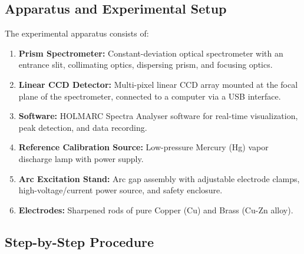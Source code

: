 \documentclass[12pt, a4paper]{article}
\begin{document}
\subsection{Apparatus and Experimental Setup}
The experimental apparatus consists of:
\begin{enumerate}
    \item \textbf{Prism Spectrometer:} Constant-deviation optical spectrometer with an entrance slit, collimating optics, dispersing prism, and focusing optics.
    \item \textbf{Linear CCD Detector:} Multi-pixel linear CCD array mounted at the focal plane of the spectrometer, connected to a computer via a USB interface.
    \item \textbf{Software:} HOLMARC Spectra Analyser software for real-time visualization, peak detection, and data recording.
    \item \textbf{Reference Calibration Source:} Low-pressure Mercury (Hg) vapor discharge lamp with power supply.
    \item \textbf{Arc Excitation Stand:} Arc gap assembly with adjustable electrode clamps, high-voltage/current power source, and safety enclosure.
    \item \textbf{Electrodes:} Sharpened rods of pure Copper (Cu) and Brass (Cu-Zn alloy).
\end{enumerate}

\subsection{Step-by-Step Procedure}
\end{document}
